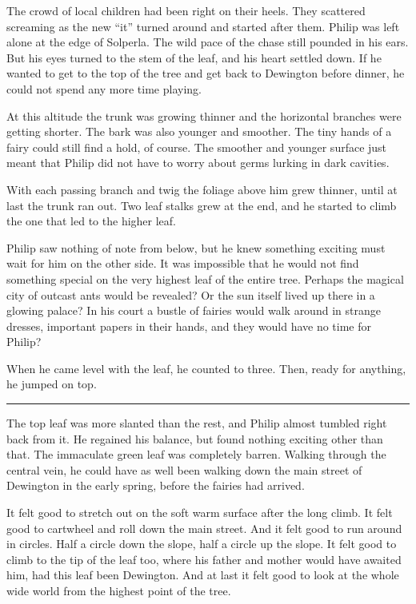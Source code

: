 \documentclass[10pt]{memoir}
\renewcommand{\pfbreakdisplay}{\bigskip \ding{166} \bigskip}
\newcommand{\secbreak}{\fancybreak{\pfbreakdisplay}}
\begin{document}
The crowd of local children had been right on their heels. They scattered
screaming as the new ``it'' turned around and started after them. Philip was
left alone at the edge of Solperla. The wild pace of the chase still pounded in
his ears. But his eyes turned to the stem of the leaf, and his heart settled
down. If he wanted to get to the top of the tree and get back to Dewington
before dinner, he could not spend any more time playing.

At this altitude the trunk was growing thinner and the horizontal branches were
getting shorter. The bark was also younger and smoother. The tiny hands of a
fairy could still find a hold, of course. The smoother and younger surface just
meant that Philip did not have to worry about germs lurking in dark cavities.

With each passing branch and twig the foliage above him grew thinner, until at
last the trunk ran out. Two leaf stalks grew at the end, and he started to
climb the one that led to the higher leaf.

Philip saw nothing of note from below, but he knew something exciting must wait
for him on the other side. It was impossible that he would not find something
special on the very highest leaf of the entire tree. Perhaps the magical city
of outcast ants would be revealed? Or the sun itself lived up there in a
glowing palace? In his court a bustle of fairies would walk around in strange
dresses, important papers in their hands, and they would have no time for
Philip?

When he came level with the leaf, he counted to three. Then, ready for
anything, he jumped on top.

\secbreak

The top leaf was more slanted than the rest, and Philip almost tumbled right
back from it. He regained his balance, but found nothing exciting other than
that. The immaculate green leaf was completely barren. Walking through the
central vein, he could have as well been walking down the main street of
Dewington in the early spring, before the fairies had arrived.

It felt good to stretch out on the soft warm surface after the long climb. It
felt good to cartwheel and roll down the main street. And it felt good to run
around in circles. Half a circle down the slope, half a circle up the slope. It
felt good to climb to the tip of the leaf too, where his father and mother
would have awaited him, had this leaf been Dewington. And at last it felt good
to look at the whole wide world from the highest point of the tree.
\end{document}
